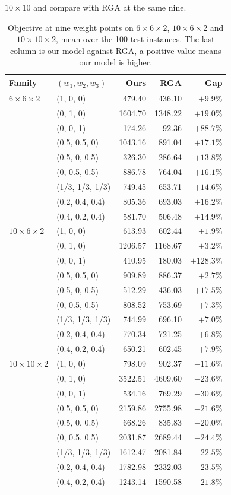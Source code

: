 $10\times10$ and compare with RGA at the same nine.\begin{table}[t]
\centering
\caption{Objective at nine weight points on $6\times6\times2$, $10\times6\times2$ and
$10\times10\times2$, mean over the 100 test instances. The last column is our model against RGA, a
positive value means our model is higher.}
\label{tab:weights}
\footnotesize
\setlength{\tabcolsep}{3.0pt}
\begin{tabular}{llrrr}
\toprule
Family & $(w_1,w_2,w_3)$ & Ours & RGA & Gap \\
\midrule
$6\times6\times2$ & (1, 0, 0) & 479.40 & 436.10 & $+9.9\%$ \\
 & (0, 1, 0) & 1604.70 & 1348.22 & $+19.0\%$ \\
 & (0, 0, 1) & 174.26 & 92.36 & $+88.7\%$ \\
 & (0.5, 0.5, 0) & 1043.16 & 891.04 & $+17.1\%$ \\
 & (0.5, 0, 0.5) & 326.30 & 286.64 & $+13.8\%$ \\
 & (0, 0.5, 0.5) & 886.78 & 764.04 & $+16.1\%$ \\
 & (1/3, 1/3, 1/3) & 749.45 & 653.71 & $+14.6\%$ \\
 & (0.2, 0.4, 0.4) & 805.36 & 693.03 & $+16.2\%$ \\
 & (0.4, 0.2, 0.4) & 581.70 & 506.48 & $+14.9\%$ \\
\midrule
$10\times6\times2$ & (1, 0, 0) & 613.93 & 602.44 & $+1.9\%$ \\
 & (0, 1, 0) & 1206.57 & 1168.67 & $+3.2\%$ \\
 & (0, 0, 1) & 410.95 & 180.03 & $+128.3\%$ \\
 & (0.5, 0.5, 0) & 909.89 & 886.37 & $+2.7\%$ \\
 & (0.5, 0, 0.5) & 512.29 & 436.03 & $+17.5\%$ \\
 & (0, 0.5, 0.5) & 808.52 & 753.69 & $+7.3\%$ \\
 & (1/3, 1/3, 1/3) & 744.99 & 696.10 & $+7.0\%$ \\
 & (0.2, 0.4, 0.4) & 770.34 & 721.25 & $+6.8\%$ \\
 & (0.4, 0.2, 0.4) & 650.21 & 602.45 & $+7.9\%$ \\
\midrule
$10\times10\times2$ & (1, 0, 0) & 798.09 & 902.37 & $-11.6\%$ \\
 & (0, 1, 0) & 3522.51 & 4609.60 & $-23.6\%$ \\
 & (0, 0, 1) & 534.16 & 769.29 & $-30.6\%$ \\
 & (0.5, 0.5, 0) & 2159.86 & 2755.98 & $-21.6\%$ \\
 & (0.5, 0, 0.5) & 668.26 & 835.83 & $-20.0\%$ \\
 & (0, 0.5, 0.5) & 2031.87 & 2689.44 & $-24.4\%$ \\
 & (1/3, 1/3, 1/3) & 1612.47 & 2081.84 & $-22.5\%$ \\
 & (0.2, 0.4, 0.4) & 1782.98 & 2332.03 & $-23.5\%$ \\
 & (0.4, 0.2, 0.4) & 1243.14 & 1590.58 & $-21.8\%$ \\
\bottomrule
\end{tabular}
\end{table}

